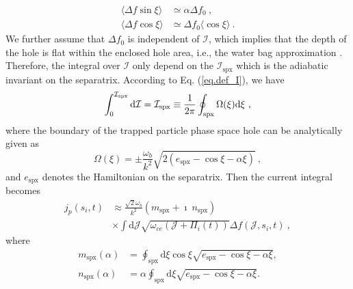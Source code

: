  \cite{berk1999} 
\begin{equation}
    \begin{aligned}
    \langle\Delta f \sin \xi \rangle &\simeq \alpha \Delta f_0 ~, \\ 
    \langle \Delta f \cos \xi \rangle &\simeq  \Delta f_0 \langle \cos \xi \rangle ~.
    \end{aligned}
\end{equation}
We further assume that $\Delta f_0$ is independent of $\mathcal{I}$, which implies that the depth of the hole is flat within the enclosed hole area, i.e., the water bag approximation \cite{omura_theory_2008,hezaveh2021}. 
Therefore, the integral over $\mathcal{I}$ only depend on the $\mathcal{I}_\mathrm{spx}$ which is the 
 adiabatic invariant on the separatrix. 
According to Eq. (\ref{eq.def_I}), we have
\begin{equation}
    \int^{\mathcal{I}_\mathrm{s p x}}_0 \mathrm{d}\mathcal{I} = \mathcal{I}_\mathrm{s p x} \equiv {1\over2\pi} \oint_\mathrm{s p x} \Omega (\xi) \mathrm{d} \xi~,
\end{equation}
where the boundary of the trapped particle phase space hole can be analytically given as
\begin{equation}
    \Omega(\xi) = \pm \frac{\omega_b}{k^2} \sqrt{2 (e_\mathrm{spx}-\cos \xi - \alpha \xi)}~,
\end{equation}
and $e_\mathrm{spx}$ denotes the Hamiltonian on the separatrix.
Then the current integral becomes  
\begin{equation}\label{eq.adi_J}
    \begin{aligned}
    j_p(s_i,t) & \approx \frac{\sqrt{2} \omega_b}{k^2}  \left(m_\mathrm{s p x}+\imath ~ n_\mathrm{s p x}\right) \\
    & \times  \int \mathrm{d} \mathcal{J} \sqrt{ \omega_{c e}(\mathcal{J}+\Pi_i(t))} \Delta f(\mathcal{J},s_i,t) ~,
    \end{aligned}
\end{equation}
where
\begin{equation}\label{eq.function}
    \begin{aligned}
        m_\mathrm{spx}(\alpha) & = \oint_\mathrm{s p x} \mathrm{d} \xi \cos \xi \sqrt{e_\mathrm{s p x}-\cos \xi-\alpha \xi}, 
        \\
        n_\mathrm{spx}(\alpha) &  = \alpha \oint_\mathrm{s p x} \mathrm{d} \xi \sqrt{e_\mathrm{s p x}-\cos \xi-\alpha \xi}.
    \end{aligned}
\end{equation}

